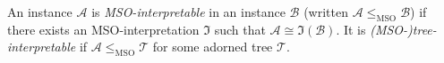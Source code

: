\begin{definition}


An instance $\mathcal{A}$ is \emph{MSO-interpretable} in an instance $\mathcal{B}$ (written $\mathcal{A} \leq_{\text{MSO}} \mathcal{B}$) if there exists an MSO-interpretation $\mathfrak{I}$ such that $\mathcal{A} \cong \mathfrak{I}(\mathcal{B})$. It is \emph{(MSO-)tree-interpretable} if $\mathcal{A} \leq_{\text{MSO}} \mathcal{T}$ for some adorned tree $\mathcal{T}$.
\end{definition}

